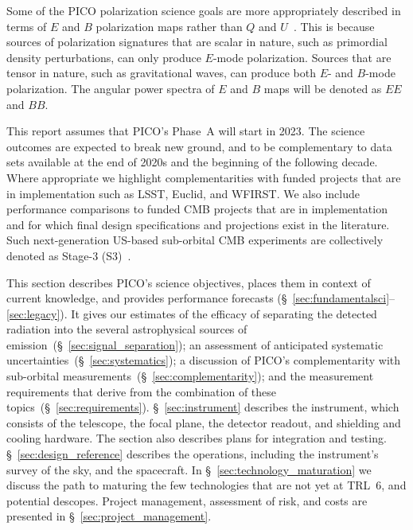 \documentclass[PICOReport.tex]{subfiles}
\begin{document}

Some of the PICO polarization science goals are more appropriately described in terms of $E$ and $B$ polarization maps rather than $Q$ and $U$~\cite{seljak97,kamionkowski97a, zaldarriaga97b,kamionkowski97b}. This is because sources of polarization signatures that are scalar in nature, such as primordial density perturbations, can only produce $E$-mode polarization. Sources that are tensor in nature, such as gravitational waves, can produce both $E$- and $B$-mode polarization. The angular power spectra of $E$ and $B$ maps will be denoted as $EE$ and $BB$.

This report assumes that PICO's Phase~A will start in 2023. The science outcomes are expected to break new ground, and to be complementary to data sets available at the end of 2020s and the beginning of the following decade. Where appropriate we highlight complementarities with funded projects that are in implementation such as LSST, Euclid, and WFIRST. We also include performance comparisons to funded CMB projects that are in implementation and for which final design specifications and projections exist in the literature. Such next-generation US-based sub-orbital CMB experiments are collectively denoted as Stage-3 (S3)~\citep{advancedact,spt3g,so,class_overview,biceparray,spider,piper}. 


This section describes PICO's science objectives, places them in context of current knowledge, and provides performance forecasts (\S~\ref{sec:fundamentalsci}--\ref{sec:legacy}). It gives our estimates of the efficacy of separating the detected radiation into the several astrophysical sources of emission~(\S~\ref{sec:signal_separation}); an assessment of anticipated systematic uncertainties~(\S~\ref{sec:systematics}); a discussion of PICO's complementarity with sub-orbital measurements~(\S~\ref{sec:complementarity}); and the measurement requirements that derive from the combination of these topics~(\S~\ref{sec:requirements}).  \S~\ref{sec:instrument} describes the instrument, which consists of the telescope, the focal plane, the detector readout, and shielding and cooling hardware. The section also describes plans for integration and testing. \S~\ref{sec:design_reference} describes the operations, including the instrument's survey of the sky, and the spacecraft. In \S~\ref{sec:technology_maturation} we discuss the path to maturing the few technologies that are not yet at \ac{TRL}~6, and potential descopes. Project management, assessment of risk, and costs are presented in \S~\ref{sec:project_management}. 
\end{document}
